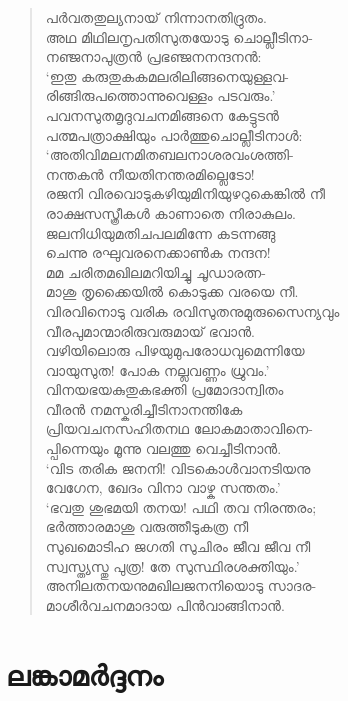 \begin{verse}
പര്‍വതതുല്യനായ് നിന്നാനതിദ്രുതം.\\
അഥ മിഥിലനൃപതിസുതയോടു ചൊല്ലീടിനാ-\\
നഞ്ജനാപുത്രന്‍ പ്രഭഞ്ജനനന്ദനന്‍:\\
‘ഇതു കരുതുകകമലരിലിങ്ങനെയുള്ളവ-\\
രിങ്ങിരുപത്തൊന്നുവെള്ളം പടവരും.’\\
പവനസുതമൃദുവചനമിങ്ങനെ കേട്ടുടന്‍\\
പത്മപത്രാക്ഷിയും പാര്‍ത്തുചൊല്ലീടിനാള്‍:\\
‘അതിവിമലനമിതബലനാശരവംശത്തി-\\
നന്തകന്‍ നീയതിനന്തരമില്ലെടോ!\\
രജനി വിരവൊടുകഴിയുമിനിയുഴറുകെങ്കില്‍ നീ\\
രാക്ഷസസ്ത്രീകള്‍ കാണാതെ നിരാകുലം.\\
ജലനിധിയുമതിചപലമിന്നേ കടന്നങ്ങു\\
ചെന്നു രഘുവരനെക്കാണ്‍ക നന്ദന!\\
മമ ചരിതമഖിലമറിയിച്ചു ചൂഡാരത്ന-\\
മാശു തൃക്കൈയില്‍ കൊടുക്ക വരയെ നീ.\\
വിരവിനൊടു വരിക രവിസുതനുമുരുസൈന്യവും\\
വീരപുമാന്മാരിരുവരുമായ് ഭവാന്‍.\\
വഴിയിലൊരു പിഴയുമുപരോധവുമെന്നിയേ\\
വായുസുത! പോക നല്ലവണ്ണം ധ്രുവം.’\\
വിനയഭയകുതുകഭക്തി പ്രമോദാന്വിതം\\
വീരന്‍ നമസ്കരിച്ചീടിനാനന്തികേ\\
പ്രിയവചനസഹിതനഥ ലോകമാതാവിനെ-\\
പ്പിന്നെയും മൂന്നു വലത്തു വെച്ചീടിനാന്‍.\\
‘വിട തരിക ജനനി! വിടകൊള്‍വാനടിയനു\\
വേഗേന, ഖേദം വിനാ വാഴ്ക സന്തതം.’\\
‘ഭവതു ശുഭമയി തനയ! പഥി തവ നിരന്തരം;\\
ഭര്‍ത്താരമാശു വരുത്തീടുകത്ര നീ\\
സുഖമൊടിഹ ജഗതി സുചിരം ജീവ ജീവ നീ\\
സ്വസ്ത്യസ്തു പുത്ര! തേ സുസ്ഥിരശക്തിയും.’\\
അനിലതനയനുമഖിലജനനിയൊടു സാദര-\\
മാശീര്‍വചനമാദായ പിന്‍വാങ്ങിനാന്‍.
\end{verse}


\section{ലങ്കാമര്‍ദ്ദനം}


